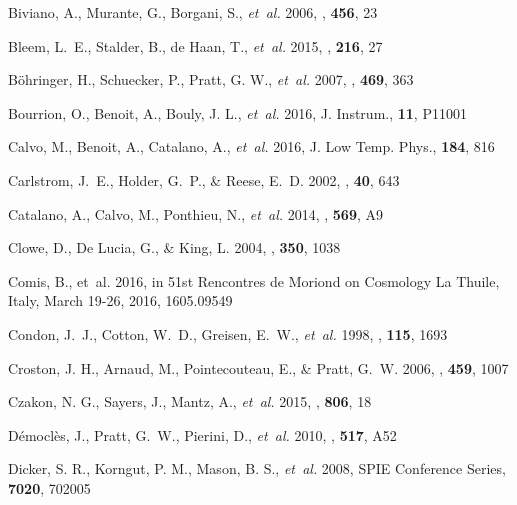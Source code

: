 \documentclass[traditabstract]{aa}
\begin{document}
\begin{thebibliography}{81}
{Biviano}, A., {Murante}, G., {Borgani}, S.,  \emph{et~al.} 2006, \aap, \textbf{456}, 23

Bleem, L.~E., Stalder, B., de Haan, T., \emph{et~al.} 2015, \apjs, \textbf{216}, 27

B{\"o}hringer, H., Schuecker, P., Pratt, G. W., \emph{et~al.} 2007, \aap, \textbf{469}, 363

Bourrion, O., Benoit, A., Bouly, J. L., \emph{et~al.} 2016, J. Instrum., \textbf{11}, P11001

Calvo, M., Benoit, A., Catalano, A., \emph{et~al.}  2016, J. Low Temp. Phys., \textbf{184}, 816

Carlstrom, J.~E., Holder, G.~P., \& Reese, E.~D. 2002, \araa, \textbf{40}, 643

Catalano, A., Calvo, M., Ponthieu, N., \emph{et~al.} 2014, \aap, \textbf{569}, A9

Clowe, D., De Lucia, G., \& King, L. 2004, \mnras, \textbf{350}, 1038

Comis, B., {et~al.} 2016, in {51st Rencontres de Moriond on Cosmology La
  Thuile, Italy, March 19-26, 2016}, 1605.09549

Condon, J.~J., Cotton, W.~D., Greisen, E.~W., \emph{et~al.} 1998, \aj, \textbf{115}, 1693  

Croston, J. H., Arnaud, M., Pointecouteau, E., \& Pratt, G.~W. 2006, \aap, \textbf{459}, 1007
  
{Czakon}, N. G., {Sayers}, J.,  {Mantz}, A., \emph{et~al.} 2015, \apj, \textbf{806}, 18

D\'emocl\`es, J., Pratt, G.~W., Pierini, D., \emph{et~al.} 2010, \aap, \textbf{517}, A52

Dicker, S. R., Korngut, P. M., Mason, B. S., \emph{et~al.} 2008, SPIE Conference Series, \textbf{7020}, 702005
  

\end{thebibliography}
\end{document}

